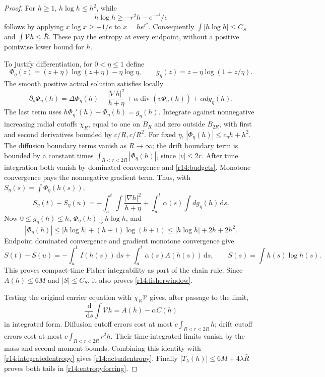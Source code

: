 \documentclass[11pt]{article}
\numberwithin{equation}{section}
\newcommand{\dd}{\,\mathrm d}
\begin{document}
\begin{proof}
For $h\ge1$, $h\log h\le h^2$, while
\[
 h\log h\ge-r^2h-e^{-r^2}/e
\]
follows by applying $x\log x\ge-1/e$ to $x=he^{r^2}$.
Consequently $\int|h\log h|\le C_S$ and
$\int\mathcal Vh\le\bar R$. These pay the entropy at every endpoint,
without a positive pointwise lower bound for $h$.

To justify differentiation, for $0<\eta\le1$ define
\[
 \Phi_\eta(z)=(z+\eta)\log(z+\eta)-\eta\log\eta,
 \qquad g_\eta(z)=z-\eta\log(1+z/\eta).
\]
The smooth positive actual solution satisfies locally
\begin{equation}\label{r14:regularizedchain}
 \partial_s\Phi_\eta(h)=\Delta\Phi_\eta(h)
 -\frac{|\nabla h|^2}{h+\eta}
 +\alpha\operatorname{div}(v\Phi_\eta(h))
 +\alpha d g_\eta(h).
\end{equation}
The last term uses $h\Phi_\eta'(h)-\Phi_\eta(h)=g_\eta(h)$.
Integrate against nonnegative increasing radial cutoffs $\chi_R$,
equal to one on $B_R$ and zero outside $B_{2R}$, with first and
second derivatives bounded by $c/R,c/R^2$. For fixed $\eta$,
$|\Phi_\eta(h)|\le c_\eta h+h^2$. The diffusion boundary terms vanish
as $R\to\infty$; the drift boundary term is bounded by a constant
times $\int_{R<r<2R}|\Phi_\eta(h)|$, since $|v|\le2r$.
After time integration both vanish by dominated convergence and
\eqref{r14:budgets}. Monotone convergence pays the nonnegative gradient
term. Thus, with $S_\eta(s)=\int\Phi_\eta(h(s))$,
\[
 S_\eta(t)-S_\eta(u)
 =-\int_u^t\!\int\frac{|\nabla h|^2}{h+\eta}
   +\int_u^t\alpha(s)\!\int d g_\eta(h)\dd s.
\]
Now $0\le g_\eta(h)\le h$, $\Phi_\eta(h)\downarrow h\log h$, and
\[
 |\Phi_\eta(h)|\le|h\log h|+(h+1)\log(h+1)
                 \le|h\log h|+2h+2h^2.
\]
Endpoint dominated convergence and gradient monotone convergence give
\begin{equation}\label{r14:integratedentropy}
 S(t)-S(u)=-\int_u^tI(h(s))\dd s
                    +\int_u^t\alpha(s)A(h(s))\dd s,
 \qquad S(s)=\int h(s)\log h(s).
\end{equation}
This proves compact-time Fisher integrability as part of the chain
rule. Since $A(h)\le6M$ and $|S|\le C_S$, it also proves
\eqref{r14:fisherwindow}.

Testing the original carrier equation with $\chi_R\mathcal V$ gives,
after passage to the limit,
\[
 \frac{\dd}{\dd s}\int\mathcal Vh=A(h)-\alpha C(h)
\]
in integrated form. Diffusion cutoff errors cost at most
$c\int_{R<r<2R}h$; drift cutoff errors cost at most
$c\int_{R<r<2R}r^2h$. Their time-integrated limits vanish by the mass
and second-moment bounds. Combining this identity with
\eqref{r14:integratedentropy} gives \eqref{r14:actualentropy}.
Finally $|T_\lambda(h)|\le6M+4\lambda\bar R$ proves both tails in
\eqref{r14:entropyforcing}.
\end{proof}
\end{document}
